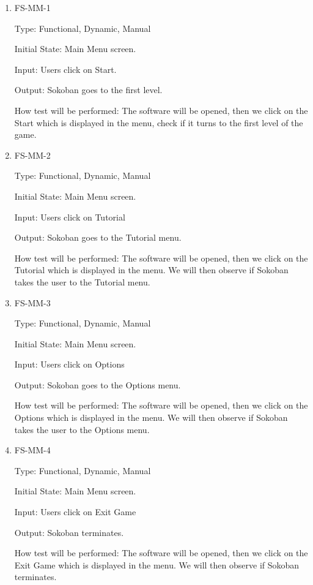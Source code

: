\documentclass[12pt, titlepage]{article}
\begin{document}
\begin{enumerate}

\item{FS-MM-1\\}

Type: Functional, Dynamic, Manual
					
Initial State: Main Menu screen.
					
Input: Users click on Start.
					
Output: Sokoban goes to the first level.
					
How test will be performed: The software will be opened, then we click on the Start which is displayed in the menu, check if it turns to the first level of the game. 

\item{FS-MM-2\\}

Type: Functional, Dynamic, Manual
					
Initial State: Main Menu screen.
					
Input: Users click on Tutorial
					
Output: Sokoban goes to the Tutorial menu.
					
How test will be performed: The software will be opened, then we click on the Tutorial which is displayed in the menu. We will then observe if Sokoban takes the user to the Tutorial menu. 

\item{FS-MM-3\\}

Type: Functional, Dynamic, Manual
					
Initial State: Main Menu screen.
					
Input: Users click on Options
					
Output: Sokoban goes to the Options menu.
					
How test will be performed: The software will be opened, then we click on the Options which is displayed in the menu. We will then observe if Sokoban takes the user to the Options menu. 

\item{FS-MM-4\\}

Type: Functional, Dynamic, Manual
					
Initial State: Main Menu screen.
					
Input: Users click on Exit Game
					
Output: Sokoban terminates.
					
How test will be performed: The software will be opened, then we click on the Exit Game which is displayed in the menu. We will then observe if Sokoban terminates.

\end{enumerate}
\end{document}
